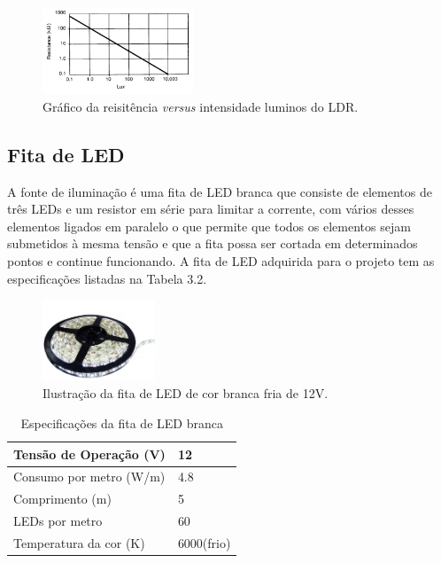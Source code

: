 \begin{figure}[htp]
    \begin{center}
    \includegraphics[width=0.4\textwidth]{figuras/reta.PNG}
    \end{center}
    \caption[Gráfico da reisitência \textit{versus} intensidade luminos do LDR.]{Gráfico da reisitência \textit{versus} intensidade luminos do LDR.}
    \label{reta}
\end{figure}

\subsection{Fita de LED}

A fonte de iluminação é uma fita de LED branca que consiste de elementos de três LEDs e um resistor em série para limitar a corrente, com vários desses elementos ligados em paralelo o que permite que todos os elementos sejam submetidos à mesma tensão e que a fita possa ser cortada em determinados pontos e continue funcionando. A fita de LED adquirida para o projeto tem as especificações listadas na Tabela 3.2.

\begin{figure}[htb]
    \begin{center}
    \includegraphics[width=0.3\textwidth]{figuras/fitaled.PNG}
    \end{center}
    \caption[Ilustração da fita de LED branca.]{Ilustração da fita de LED de cor branca fria de 12V.}
    \label{fitaled}
\end{figure}

 

\begin{table}[hbt]
    \centering
    \label{fitaled_dados}
    \caption{Especificações da fita de LED branca}
    \begin{tabular}{ll} 
        \hline
        Tensão de Operação (V)  & 12            \\ 
        \hline
        Consumo por metro (W/m) & 4.8           \\ 
        \hline
        Comprimento (m)         & 5             \\ 
        \hline
        LEDs por metro          & 60            \\ 
        \hline
        Temperatura da cor (K)  & 6000(frio)    \\
        \hline
    \end{tabular}
\end{table}

